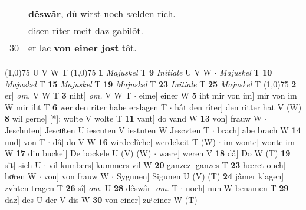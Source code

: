 \documentclass[8pt,a4paper,notitlepage]{article}
\begin{document}
\begin{table}[ht]
\begin{minipage}[t]{0.5\linewidth}
\begin{tabular}{rl}
 & \textbf{dêswâr}, dû wirst noch sælden rîch.\\ 
 & disen rîter meit daz gabilôt.\\ 
30 & er lac \textbf{von einer jost} tôt.\\ 
\end{tabular}
\scriptsize
\line(1,0){75} \newline
U V W T \newline
\line(1,0){75} \newline
\textbf{1} \textit{Majuskel} T  \textbf{9} \textit{Initiale} U V W   $\cdot$ \textit{Majuskel} T  \textbf{10} \textit{Majuskel} T  \textbf{15} \textit{Majuskel} T  \textbf{19} \textit{Majuskel} T  \textbf{23} \textit{Initiale} T  \textbf{25} \textit{Majuskel} T  \newline
\line(1,0){75} \newline
\textbf{2} er] \textit{om.} V W T \textbf{3} niht] \textit{om.} V W T  $\cdot$ eime] einer W \textbf{5} iht mir von im] mir von im W mir iht T \textbf{6} wer den riter habe erslagen T  $\cdot$ hât den rîter] den ritter hat V (W) \textbf{8} wil gerne] [*]: wolte V wolte T \textbf{11} vant] do vand W \textbf{13} von] frauw W  $\cdot$ Jeschuten] Jescuͦten U iescuten V iestuten W Jescvten T  $\cdot$ brach] abe brach W \textbf{14} und] von T  $\cdot$ dâ] do V W \textbf{16} wirdeclîche] werdekeit T (W)  $\cdot$ im wonte] wonte im W \textbf{17} diu buckel] De bockele U (V) (W)  $\cdot$ wære] weren V \textbf{18} dâ] Do W (T) \textbf{19} sît] sich U  $\cdot$ vil kumbers] kummers vil W \textbf{20} ganzez] ganzes T \textbf{23} hœret ouch] hoͤren W  $\cdot$ von] von frauw W  $\cdot$ Sygunen] Sigunen U (V) (T) \textbf{24} jâmer klagen] zvhten tragen T \textbf{26} sî] \textit{om.} U \textbf{28} dêswâr] \textit{om.} T  $\cdot$ noch] nun W benamen T \textbf{29} daz] des U der V dis W \textbf{30} von einer] zuͦ einer W (T) \newline
\end{minipage}
\end{table}
\end{document}
